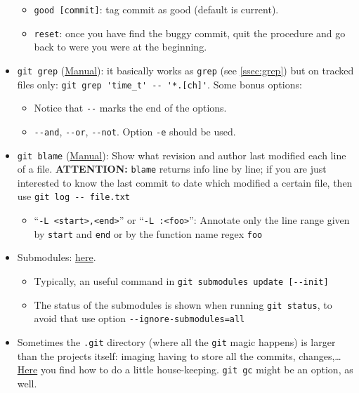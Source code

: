 \documentclass[a4paper,12pt,%
              final%
              ]{article}
\begin{document}
\begin{itemize}
\begin{itemize}
      \item \verb|good [commit]|: tag commit as good (default is current).
      \item \verb|reset|: once you have find the buggy commit, quit the procedure and go back to were you were at the beginning.
    \end{itemize}
  \item \verb|git grep| (\href{https://git-scm.com/docs/git-grep}{Manual}): it basically works as \verb|grep| (see \autoref{ssec:grep}) but on tracked files only: \verb|git grep 'time_t' -- '*.[ch]'|. Some bonus options:
    \begin{itemize}
      \item Notice that \verb|--| marks the end of the options.
      \item \verb|--and|, \verb|--or|, \verb|--not|. Option \verb|-e| should be used.
    \end{itemize}
  \item \verb|git blame| (\href{https://git-scm.com/docs/git-blame}{Manual}): Show what revision and author last modified each line of a file. \textbf{ATTENTION:} \texttt{blame} returns info line by line; if you are just interested to know the last commit to date which modified a certain file, then use \verb|git log -- file.txt|
    \begin{itemize}
      \item ``\verb|-L <start>,<end>|'' or ``\verb|-L :<foo>|'': Annotate only the line range given by \verb|start| and \verb|end| or by the function name regex \verb|foo|
    \end{itemize}
  \item Submodules: \href{https://git-scm.com/book/en/v2/Git-Tools-Submodules}{here}.
    \begin{itemize}
      \item Typically, an useful command in \verb|git submodules update [--init]|
      \item The status of the submodules is shown when running \verb|git status|, to avoid that use option \verb|--ignore-submodules=all|
    \end{itemize}
  \item Sometimes the \texttt{.git} directory (where all the \texttt{git} magic happens) is larger than the projects itself: imaging having to store all the commits, changes,\ldots{} \href{https://stackoverflow.com/questions/5277467/how-can-i-clean-my-git-folder-cleaned-up-my-project-directory-but-git-is-sti}{Here} you find how to do a little house-keeping. \verb|git gc| might be an option, as well.

\end{itemize}
\end{document}
